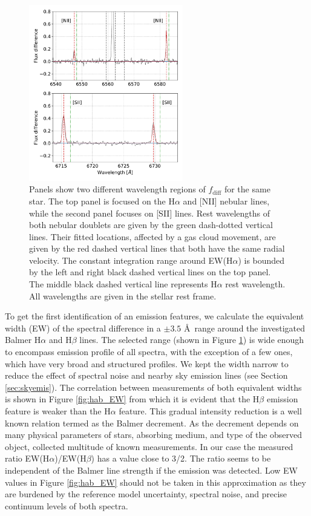 \begin{figure}
	\centering
	\includegraphics[width=0.6\textwidth]{paper_180131002701292_1.pdf}
	\caption{Panels show two different wavelength regions of $f_\mathrm{diff}$ for the same star. The top panel is focused on the H$\alpha$ and [NII] nebular lines, while the second panel focuses on [SII] lines. Rest wavelengths of both nebular doublets are given by the green dash-dotted vertical lines. Their fitted locations, affected by a gas cloud movement, are given by the red dashed vertical lines that both have the same radial velocity. The constant integration range around EW(H$\alpha$) is bounded by the left and right black dashed vertical lines on the top panel. The middle black dashed vertical line represents H$\alpha$ rest wavelength. All wavelengths are given in the stellar rest frame.}
	\label{fig:emissfit}
\end{figure}

To get the first identification of an emission features, we calculate the equivalent width (EW) of the spectral difference in a $\pm3.5$ \AA\ range around the investigated Balmer H$\alpha$ and H$\beta$ lines. The selected range (shown in Figure \ref{fig:emissfit}) is wide enough to encompass emission profile of all spectra, with the exception of a few ones, which have very broad and structured profiles. We kept the width narrow to reduce the effect of spectral noise and nearby sky emission lines (see Section \ref{sec:skyemis}). The correlation between measurements of both equivalent widths is shown in Figure \ref{fig:hab_EW} from which it is evident that the H$\beta$ emission feature is weaker than the H$\alpha$ feature. This gradual intensity reduction is a well known relation termed as the Balmer decrement. As the decrement depends on many physical parameters of stars, absorbing medium, and type of the observed object, \citet{bloom1969balmer} collected multitude of known measurements. In our case the measured ratio EW(H$\alpha$)/EW(H$\beta$) has a value close to 3/2. The ratio seems to be independent of the Balmer line strength if the emission was detected. Low EW values in Figure \ref{fig:hab_EW} should not be taken in this approximation as they are burdened by the reference model uncertainty, spectral noise, and precise continuum levels of both spectra.

